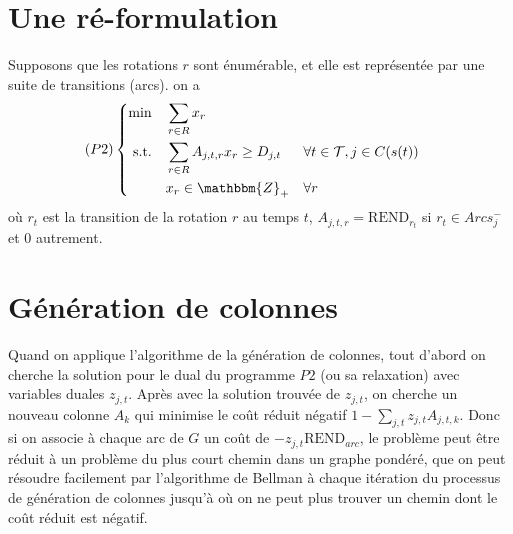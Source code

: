\documentclass[a4paper]{article}
\begin{document}
\section{Une ré-formulation}
Supposons que les rotations $r$ sont énumérable, et elle est représentée par une suite de transitions (arcs). on a
\begin{equation*}
    (P2) \left\{ 
    \begin{aligned}
    \min\quad        & \sum_{r \in R} x_{r}   \\
    \text{s.t.\quad} & \sum_{r \in R} A_{j,t,r} x_{r} \geq D_{j,t} & & \forall t\in \mathcal{T}, j \in C(s(t))\\
                     & x_r \in \mathbbm{Z}_+            & & \forall r
  \end{aligned}
\right.
\end{equation*}
où $r_t$ est la transition de la rotation $r$ au temps $t$, $A_{j,t,r} = \text{REND}_{r_t}$ si $r_t \in Arcs^{-}_{j}$ et $0$ autrement. 

\section{Génération de colonnes}
Quand on applique l'algorithme de la génération de colonnes, tout d'abord on cherche la solution pour le dual du programme $P2$ (ou sa relaxation) avec variables duales $z_{j,t}$. Après avec la solution trouvée de $z_{j,t}$, on cherche un nouveau colonne $A_{k}$ qui minimise le coût réduit négatif $1-\sum_{j,t} z_{j,t} A_{j,t,k}$. Donc si on associe à chaque arc de $G$ un coût de $-z_{j,t}\text{REND}_{arc}$, le problème peut être réduit à un problème du plus court chemin dans un graphe pondéré, que on peut résoudre facilement par l'algorithme de Bellman à chaque itération du processus de génération de colonnes jusqu'à où on ne peut plus trouver un chemin dont le coût réduit est négatif. 
\end{document}
